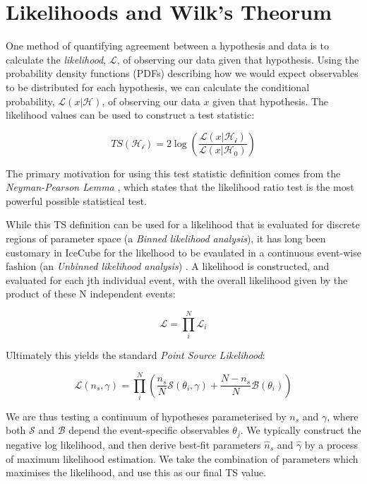 \section{Likelihoods and Wilk's Theorum}

One method of quantifying agreement between a hypothesis and data is to calculate the \emph{likelihood}, $\mathcal{L}$, of observing our data given that hypothesis. Using the probability density functions (PDFs) describing how we would expect observables to be distributed for each hypothesis, we can calculate the conditional probability, $\mathcal{L}(x | \mathcal{H})$, of observing our data $x$ given that hypothesis. The likelihood values can be used to construct a test statistic:

\begin{equation}
TS (\mathcal{H_{i}}) = 2 \log \left( \frac{\mathcal{L}(x | \mathcal{H_{i}})}{\mathcal{L}(x | \mathcal{H_{0}})} \right)
\label{eq:ts}
\end{equation}

The primary motivation for using this test statistic definition comes from the \emph{Neyman-Pearson Lemma} , which states that the likelihood ratio test is the most powerful possible statistical test. 

While this TS definition can be used for a likelihood that is evaluated for discrete regions of parameter space (a \emph{Binned likelihood analysis}), it has long been customary in IceCube for the likelhood to be evaulated in a continuous event-wise fashion (an \emph{Unbinned likelihood analysis}) . A likelihood is constructed, and evaluated for each jth individual event, with the overall likelihood given by the product of these N independent events:

\begin{equation}
	\mathcal{L} = \prod_{i}^{N} \mathcal{L}_{i}
\end{equation}

Ultimately this yields the standard \emph{Point Source Likelihood}:

\begin{equation}
	\mathcal{L}(n_{s}, \gamma) = \prod_{i}^{N} \left(\frac{n_{s}}{N} \mathcal{S}(\theta_{i}, \gamma) + \frac{N - n_{s}}{N} \mathcal{B}(\theta_{i})  \right)
\label{eq:ps_llh}
\end{equation}

We are thus testing a continuum of hypotheses parameterised by $n_{s}$ and $\gamma$, where both $\mathcal{S}$ and $\mathcal{B}$ depend the event-specific observables $\theta_{j}$. We typically construct the negative log likelihood, and then derive best-fit parameters $\hat{n}_{s}$ and  $\hat{\gamma}$ by a process of maximum likelihood estimation. We take the combination of parameters which maximises the likelihood, and use this as our final TS value. 

